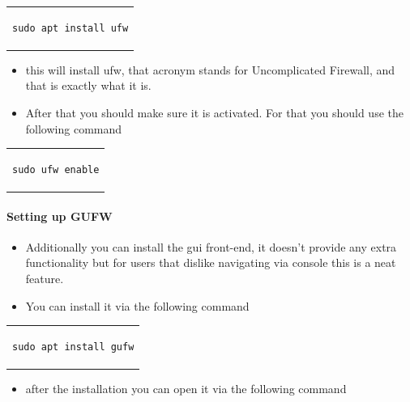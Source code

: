 \documentclass[a4paper,10pt]{article}
\begin{document}
\begin{center}
\begin{tabular}{c}
\begin{lstlisting}
sudo apt install ufw
\end{lstlisting}
\end{tabular}
\end{center}

\begin{itemize}[leftmargin=*]
\item this will install ufw, that acronym stands for Uncomplicated Firewall, and that is exactly what it is.
\item After that you should make sure it is activated. For that you should use the following command
\end{itemize}

\begin{center}
\begin{tabular}{c}
\begin{lstlisting}
sudo ufw enable
\end{lstlisting}
\end{tabular}
\end{center}


\paragraph{Setting up GUFW}

\begin{itemize}[leftmargin=*]
\item Additionally you can install the gui front-end, it doesn't provide any extra functionality but for users that dislike navigating via console this is a neat feature.
\item You can install it via the following command
\end{itemize}

\begin{center}
\begin{tabular}{c}
\begin{lstlisting}
sudo apt install gufw
\end{lstlisting}
\end{tabular}
\end{center}

\begin{itemize}[leftmargin=*]
\item after the installation you can open it via the following command
\end{itemize}
\end{document}
